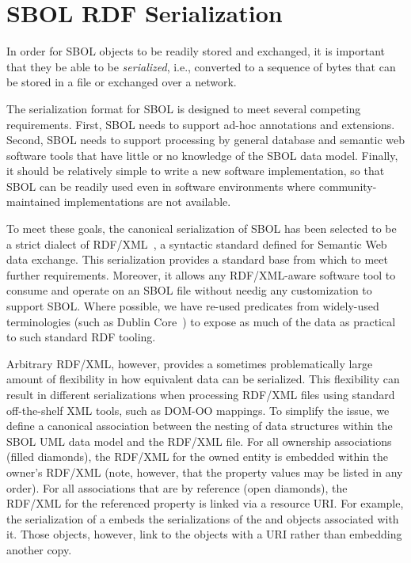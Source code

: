 \section{SBOL RDF Serialization}
\label{sec:serialization}


In order for SBOL objects to be readily stored and exchanged, it is important that they be able to be {\em serialized}, i.e., converted to a sequence of bytes that can be stored in a file or exchanged over a network.

The serialization format for SBOL is designed to meet several competing requirements. 
First, SBOL needs to support ad-hoc annotations and extensions. 
Second, SBOL needs to support processing by general database and semantic web software tools that have little or no knowledge of the SBOL data model. 
Finally, it should be relatively simple to write a new software implementation, so that SBOL can be readily used even in software environments where community-maintained implementations are not available.

To meet these goals, the canonical serialization of SBOL has been selected to be a strict dialect of RDF/XML~\cite{rdfxml}, a syntactic standard defined for Semantic Web data exchange. 
This serialization provides a standard base from which to meet further requirements. 
Moreover, it allows any RDF/XML-aware software tool to consume and operate on an SBOL file without needig any customization to support SBOL. 
Where possible, we have re-used predicates from widely-used terminologies (such as Dublin Core~\cite{dcmi2012}) to expose as much of the data as practical to such standard RDF tooling.

Arbitrary RDF/XML, however, provides a sometimes problematically large amount of flexibility in how equivalent data can be serialized. This flexibility can result in different serializations when processing RDF/XML files using standard off-the-shelf XML tools, such as DOM-OO mappings. 
To simplify the issue, we define a canonical association between the nesting of data structures within the SBOL UML data model and the RDF/XML file. For all ownership associations (filled diamonds), the RDF/XML for the owned entity is embedded within the owner's RDF/XML (note, however, that the property values may be listed in any order).
For all associations that are by reference (open diamonds), the RDF/XML for the referenced property is linked via a resource URI.
For example, the serialization of a  embeds the serializations of the  and  objects associated with it.  Those  objects, however, link to the  objects with a URI rather than embedding another copy.

